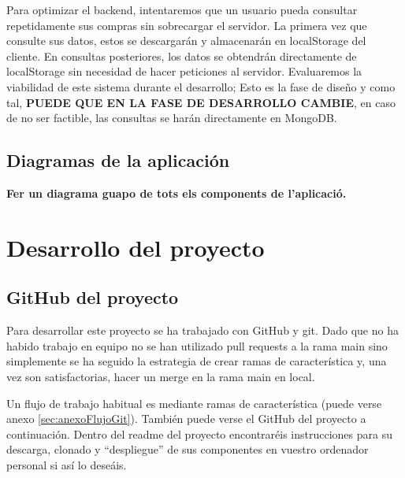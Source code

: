 \documentclass[a4paper,12pt]{report}
\begin{document}
		Para optimizar el backend, intentaremos que un usuario pueda consultar repetidamente sus compras sin sobrecargar el servidor. La primera vez que consulte sus datos, estos se descargarán y almacenarán en localStorage del cliente. En consultas posteriores, los datos se obtendrán directamente de localStorage sin necesidad de hacer peticiones al servidor. Evaluaremos la viabilidad de este sistema durante el desarrollo; Esto es la fase de diseño y como tal, \textbf{PUEDE QUE EN LA FASE DE DESARROLLO CAMBIE}, en caso de no ser factible, las consultas se harán directamente en MongoDB.
		



		
		
		
		
		
		\section{Diagramas de la aplicación}
		
		\textbf{Fer un diagrama guapo de tots els components de l'aplicació.}
	
	\chapter{Desarrollo del proyecto} %
	

	
	
				
			\section{GitHub del proyecto}
			
				Para desarrollar este proyecto se ha trabajado con GitHub y git. Dado que no ha habido trabajo en equipo no se han utilizado pull requests a la rama main sino simplemente se ha seguido la estrategia de crear ramas de característica y, una vez son satisfactorias, hacer un merge en la rama main en local.
				
				Un flujo de trabajo habitual es mediante ramas de característica (puede verse anexo \ref{sec:anexoFlujoGit}). También puede verse el GitHub del proyecto a continuación. Dentro del readme del proyecto encontraréis instrucciones para su descarga, clonado y ``despliegue'' de sus componentes en vuestro ordenador personal si así lo deseáis.
			

			
			
			
			
\end{document}
